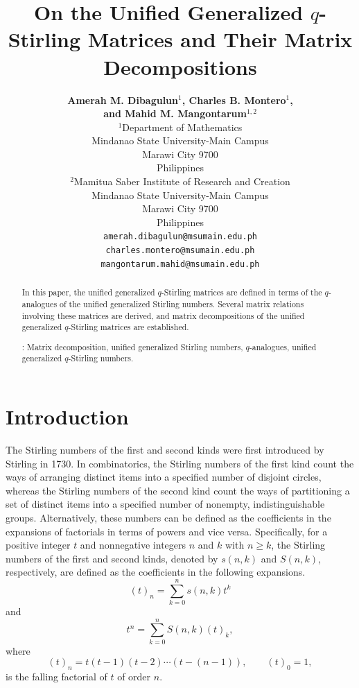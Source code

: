 \documentclass[12pt]{article}
\title{\bf On the Unified Generalized $q$-Stirling Matrices and Their Matrix Decompositions}
\author{\large{\bf Amerah M. Dibagulun$^{1}$, Charles B. Montero$^{1}$,}\\\large{\bf and Mahid M. Mangontarum$^{1,2}$}\\
$^{1}$Department of Mathematics\\
Mindanao State University-Main Campus\\
Marawi City 9700\\
Philippines\\
$^{2}$Mamitua Saber Institute of Research and Creation\\
Mindanao State University-Main Campus\\
Marawi City 9700\\
Philippines\\
{\tt amerah.dibagulun@msumain.edu.ph}\\
{\tt charles.montero@msumain.edu.ph}\\
{\tt mangontarum.mahid@msumain.edu.ph}
}
\begin{document}
\maketitle

\begin{abstract}
	In this paper, the unified generalized $q$-Stirling matrices are defined in terms of the $q$-analogues of the unified generalized Stirling numbers. Several matrix relations involving these matrices are derived, and matrix decompositions of the unified generalized $q$-Stirling matrices are established. 
	
	\bigskip
	: Matrix decomposition, unified generalized Stirling numbers, $q$-analogues, unified generalized $q$-Stirling numbers.
	
\end{abstract}

\section{Introduction}

The Stirling numbers of the first and second kinds were first introduced by Stirling \cite{Stir} in 1730. In combinatorics, the Stirling numbers of the first kind count the ways of arranging distinct items into a specified number of disjoint circles, whereas the Stirling numbers of the second kind count the ways of partitioning a set of distinct items into a specified number of nonempty, indistinguishable groups. Alternatively, these numbers can be defined as the coefficients in the expansions of factorials in terms of powers and vice versa. Specifically, for a positive integer $t$ and nonnegative integers $n$ and $k$ with $n\geq k$, the Stirling numbers of the first and second kinds, denoted by $s(n,k)$ and $S(n,k)$, respectively, are defined as the coefficients in the following expansions.
\begin{equation}
(t)_n=\sum_{k=0}^ns(n,k)t^k
\end{equation}  
and
\begin{equation}
t^n=\sum_{k=0}^nS(n,k)(t)_k,
\end{equation}
where
\begin{equation*}
(t)_n=t(t-1)(t-2)\cdots(t-(n-1)),\qquad (t)_0=1,
\end{equation*}
is the falling factorial of $t$ of order $n$.
\end{document}
